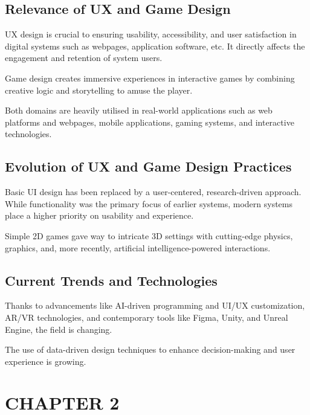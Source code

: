 \documentclass[12pt]{article}
\begin{document}
\subsection{Relevance of UX and Game Design}

UX design is crucial to ensuring usability, accessibility, and user satisfaction in digital systems such as webpages, application software, etc. It directly affects the engagement and retention of system users.

Game design creates immersive experiences in interactive games by combining creative logic and storytelling to amuse the player.

Both domains are heavily utilised in real-world applications such as web platforms and webpages, mobile applications, gaming systems, and interactive technologies.

\subsection{Evolution of UX and Game Design Practices}

Basic UI design has been replaced by a user-centered, research-driven approach. While functionality was the primary focus of earlier systems, modern systems place a higher priority on usability and experience.

Simple 2D games gave way to intricate 3D settings with cutting-edge physics, graphics, and, more recently, artificial intelligence-powered interactions.

\subsection{Current Trends and Technologies}

Thanks to advancements like AI-driven programming and UI/UX customization, AR/VR technologies, and contemporary tools like Figma, Unity, and Unreal Engine, the field is changing.

The use of data-driven design techniques to enhance decision-making and user experience is growing.


\newpage

\section*{CHAPTER 2}
\end{document}
